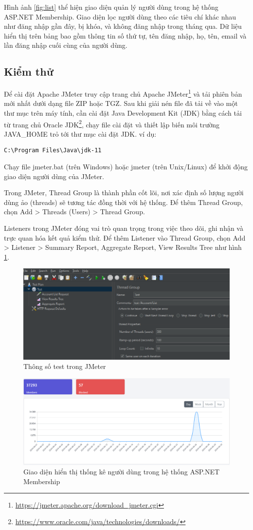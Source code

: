 \documentclass[14pt]{article}
\begin{document}
Hình ảnh \ref{fig:list} thể hiện giao diện quản lý người dùng trong hệ thống ASP.NET Membership. Giao diện lọc người dùng theo các tiêu chí khác nhau như đăng nhập gần đây, bị khóa, và không đăng nhập trong tháng qua. Dữ liệu hiển thị trên bảng bao gồm thông tin số thứ tự, tên đăng nhập, họ, tên, email và lần đăng nhập cuối cùng của người dùng.

\subsection{Kiểm thử}

Để cài đặt Apache JMeter truy cập trang chủ Apache JMeter\footnote{\url{https://jmeter.apache.org/download_jmeter.cgi}} và tải phiên bản mới nhất dưới dạng file ZIP hoặc TGZ. Sau khi giải nén file đã tải về vào một thư mục trên máy tính, cần cài đặt Java Development Kit (JDK) bằng cách tải từ trang chủ Oracle JDK\footnote{\url{https://www.oracle.com/java/technologies/downloads/}}, chạy file cài đặt và thiết lập biến môi trường JAVA\_HOME trỏ tới thư mục cài đặt JDK. ví dụ: \begin{verbatim}C:\Program Files\Java\jdk-11\end{verbatim}

Chạy file jmeter.bat (trên Windows) hoặc jmeter (trên Unix/Linux) để khởi động giao diện người dùng của JMeter.

Trong JMeter, Thread Group là thành phần cốt lõi, nơi xác định số lượng người dùng ảo (threads) sẽ tương tác đồng thời với hệ thống. Để thêm Thread Group, chọn Add > Threads (Users) > Thread Group.

Listeners trong JMeter đóng vai trò quan trọng trong việc theo dõi, ghi nhận và trực quan hóa kết quả kiểm thử. Để thêm Listener vào Thread Group, chọn Add > Listener > Summary Report, Aggregate Report, View Results Tree như hình \ref{fig:testjmeter}.


\begin{figure}
    \centering
    \includegraphics[width=0.5\linewidth]{images/testjmeter.png}
    \caption{Thông số test trong JMeter}
    \label{fig:testjmeter}
\end{figure}

\begin{figure}
    \centering
    \includegraphics[width=0.5\linewidth]{images/day.png}
    \caption{Giao diện hiển thị thống kê người dùng trong hệ thống ASP.NET Membership}
    \label{fig:day}
\end{figure}
\end{document}
